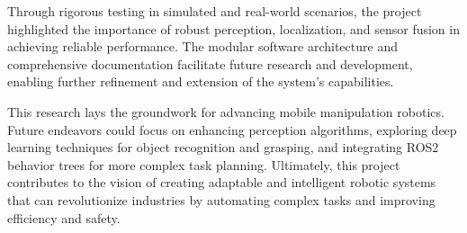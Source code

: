Through rigorous testing in simulated and real-world scenarios, the project highlighted the importance of robust 
perception, localization, and sensor fusion in achieving reliable performance. The modular software architecture 
and comprehensive documentation facilitate future research and development, enabling further refinement and 
extension of the system's capabilities.

This research lays the groundwork for advancing mobile manipulation robotics. Future endeavors could focus on 
enhancing perception algorithms, exploring deep learning techniques for object recognition and grasping, and 
integrating ROS2 behavior trees for more complex task planning. Ultimately, this project contributes to the 
vision of creating adaptable and intelligent robotic systems that can revolutionize industries by automating 
complex tasks and improving efficiency and safety.


